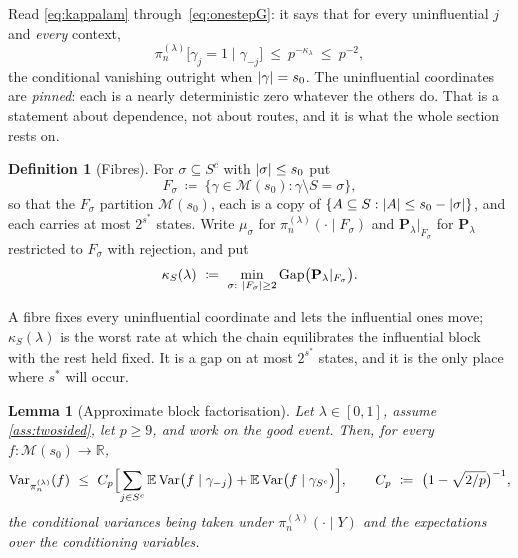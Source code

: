 \documentclass[aos]{imsart}
\DeclarePairedDelimiter{\abs}{\lvert}{\rvert}
\newcommand{\bbE}[0]{\mathbb{E}}
\newcommand{\bbR}[0]{\mathbb{R}}
\theoremstyle{plain}
\newtheorem{lemma}{Lemma}[section]
\theoremstyle{definition}
\newtheorem{definition}{Definition}[section]
\begin{document}
    Read \eqref{eq:kappalam} through~\eqref{eq:onestepG}: it says that for
    every uninfluential $j$ and \emph{every} context,
    \begin{equation}
        \label{eq:pinned}
        \pi_n^{(\lambda)}\bigl[\gamma_j=1\mid\gamma_{-j}\bigr]
        \ \leq\ p^{-\kappa_\lambda}\ \leq\ p^{-2} ,
    \end{equation}
    the conditional vanishing outright when $\abs\gamma=s_0$. The
    uninfluential coordinates are \emph{pinned}: each is a nearly
    deterministic zero whatever the others do. That is a statement about
    dependence, not about routes, and it is what the whole section rests on.

    \begin{definition}[Fibres]
        \label{def:fibres}
        For $\sigma\subseteq S^{c}$ with $\abs\sigma\leq s_0$ put
        \begin{equation}
            \label{eq:fibre}
            F_\sigma\ \coloneq\
            \{\gamma\in\mathscr{M}(s_0):\gamma\setminus S=\sigma\} ,
        \end{equation}
        so that the $F_\sigma$ partition $\mathscr{M}(s_0)$, each is a copy
        of $\{A\subseteq S:\abs A\leq s_0-\abs\sigma\}$, and each carries at
        most $2^{s^{\ast}}$ states. Write $\mu_\sigma$ for
        $\pi_n^{(\lambda)}(\cdot\mid F_\sigma)$ and
        $\mathbf{P}_\lambda|_{F_\sigma}$ for $\mathbf{P}_\lambda$ restricted
        to $F_\sigma$ with rejection, and put
        \begin{equation}
            \label{eq:kappaS}
            \kappa_S(\lambda)\ \coloneq\ \min_{\sigma:\ \abs{F_\sigma}\geq2}
            \mathrm{Gap}\bigl(\mathbf{P}_\lambda|_{F_\sigma}\bigr) .
        \end{equation}
    \end{definition}

    A fibre fixes every uninfluential coordinate and lets the influential
    ones move; $\kappa_S(\lambda)$ is the worst rate at which the chain
    equilibrates the influential block with the rest held fixed. It is a
    gap on at most $2^{s^{\ast}}$ states, and it is the only place where
    $s^{\ast}$ will occur.

    \begin{lemma}[Approximate block factorisation]
        \label{lemma:fact}
        Let $\lambda\in[0,1]$, assume \cref{ass:twosided}, let
        $p\geq9$, and work on the good event. Then, for every
        $f:\mathscr{M}(s_0)\to\bbR$,
        \begin{equation}
            \label{eq:fact}
            \mathrm{Var}_{\pi_n^{(\lambda)}}(f)\ \leq\ C_p
            \Bigl[\sum_{j\in S^{c}}
            \bbE\,\mathrm{Var}\bigl(f\mid\gamma_{-j}\bigr)
            +\bbE\,\mathrm{Var}\bigl(f\mid\gamma_{S^{c}}\bigr)\Bigr],
            \qquad
            C_p\ \coloneq\ \bigl(1-\sqrt{2/p}\bigr)^{-1} ,
        \end{equation}
        the conditional variances being taken under
        $\pi_n^{(\lambda)}(\cdot\mid Y)$ and the expectations over the
        conditioning variables.
    \end{lemma}
\end{document}
